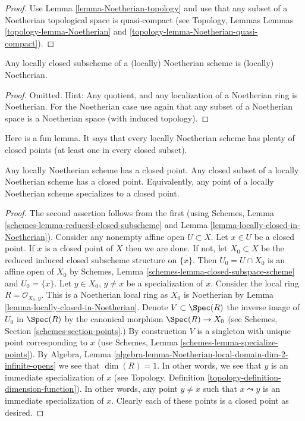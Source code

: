 \begin{proof}
Use Lemma \ref{lemma-Noetherian-topology}
and use that any subset of a Noetherian topological
space is quasi-compact (see Topology, Lemmas
Lemmas \ref{topology-lemma-Noetherian} and
\ref{topology-lemma-Noetherian-quasi-compact}).
\end{proof}

\begin{lemma}
\label{lemma-locally-closed-in-Noetherian}
Any locally closed subscheme of a (locally) Noetherian
scheme is (locally) Noetherian.
\end{lemma}

\begin{proof}
Omitted. Hint: Any quotient, and any localization of a Noetherian
ring is Noetherian. For the Noetherian case use again
that any subset of a Noetherian space is a Noetherian space
(with induced topology).
\end{proof}

\noindent
Here is a fun lemma.
It says that every locally Noetherian scheme has plenty of
closed points (at least one in every closed subset).

\begin{lemma}
\label{lemma-locally-Noetherian-closed-point}
Any locally Noetherian scheme has a closed point.
Any closed subset of a locally Noetherian scheme has a closed point.
Equivalently, any point of a locally Noetherian scheme specializes
to a closed point.
\end{lemma}

\begin{proof}
The second assertion follows from the first (using
Schemes, Lemma \ref{schemes-lemma-reduced-closed-subscheme}
and Lemma \ref{lemma-locally-closed-in-Noetherian}).
Consider any nonempty affine open $U \subset X$.
Let $x \in U$ be a closed point. If $x$ is a closed point
of $X$ then we are done. If not, let $X_0 \subset X$ be the
reduced induced closed subscheme structure on $\overline{\{x\}}$.
Then $U_0 = U \cap X_0$ is an affine open of $X_0$ by
Schemes, Lemma \ref{schemes-lemma-closed-subspace-scheme} and
$U_0 = \{x\}$. Let $y \in X_0$, $y \not = x$ be a specialization of $x$.
Consider the local ring $R = \mathcal{O}_{X_0, y}$.
This is a Noetherian local ring as $X_0$ is Noetherian
by Lemma \ref{lemma-locally-closed-in-Noetherian}. Denote $V \subset \Spec(R)$
the inverse image of $U_0$ in $\Spec(R)$ by the canonical morphism
$\Spec(R) \to X_0$ (see Schemes, Section \ref{schemes-section-points}.)
By construction $V$ is a singleton with unique point corresponding to $x$ (use
Schemes, Lemma \ref{schemes-lemma-specialize-points}).
By
Algebra, Lemma \ref{algebra-lemma-Noetherian-local-domain-dim-2-infinite-opens}
we see that $\dim(R) = 1$.
In other words, we see that $y$ is an immediate specialization
of $x$ (see Topology, Definition \ref{topology-definition-dimension-function}).
In other words, any
point $y \not = x$ such that $x \leadsto y$ is an immediate
specialization of $x$. Clearly each of these points is a
closed point as desired.
\end{proof}

